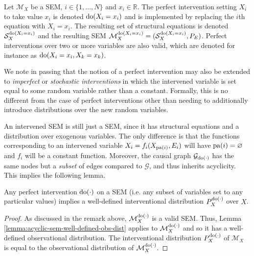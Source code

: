 \medskip

\begin{definition}
	Let $\mathcal{M}_X$ be a SEM, $i \in \{1,\ldots,N \}$ and $x_i \in \mathbb{R}$. The perfect intervention setting $X_i$ to take value $x_i$ is denoted $\operatorname{do}(X_i = x_i)$ and is implemented by replacing the $i$th equation with $X_i = x_i$. The resulting set of structural equations is denoted $\mathcal{S}_X^{\operatorname{do}(X_i=x_i)}$ and the resulting SEM $\mathcal{M}_X^{\operatorname{do}(X_i=x_i)} = (\mathcal{S}_X^{\operatorname{do}(X_i=x_i)}, P_E)$.
	Perfect interventions over two or more variables are also valid, which are denoted for instance as $\operatorname{do}(X_i = x_i, X_k = x_k)$.
\end{definition}

We note in passing that the notion of a perfect intervention may also be extended to \emph{imperfect} or \emph{stochastic interventions} in which the intervened variable is set equal to some random variable rather than a constant. Formally, this is no different from the case of perfect interventions other than needing to additionally introduce distributions over the new random variables. 

An intervened SEM is still just a SEM, since it has structural equations and a distribution over exogenous variables. The only difference is that the functions corresponding to an intervened variable $X_i = f_i(X_{\operatorname{pa}(i)}, E_i)$ will have $\operatorname{pa}(i) = \varnothing$ and $f_i$ will be a constant function. Moreover, the causal graph $\mathcal{G}_{\operatorname{do}(\cdot)}$ has the same nodes but a \emph{subset} of edges compared to $\mathcal{G}$, and thus inherits acyclicity. This implies the following lemma.

\medskip

\begin{lemma}\label{lemma:acyclic-sem-well-defined-int-dist}
	Any perfect intervention $\operatorname{do}(\cdot)$ on a SEM (i.e. any subset of variables set to any particular values) implies a well-defined interventional distribution $P^{\operatorname{do}(\cdot)}_X$ over $X$.
\end{lemma}
\begin{proof}
	As discussed in the remark above, $\mathcal{M}_X^{\operatorname{do}(\cdot)}$ is a valid SEM. Thus, Lemma \ref{lemma:acyclic-sem-well-defined-obs-dist} applies to $\mathcal{M}_X^{\operatorname{do}(\cdot)}$ and so it has a well-defined observational distribution. 
	The interventional distribution $P_X^{\operatorname{do}(\cdot)}$ of $\mathcal{M}_X$ is equal to the observational distribution of $\mathcal{M}_X^{\operatorname{do}(\cdot)}$.
\end{proof}
	
